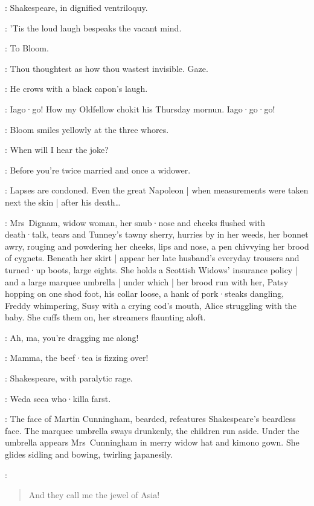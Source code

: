 :
Shakespeare,
in dignified ventriloquy.

\Shakespeare:
'Tis the loud laugh bespeaks the vacant mind.

:
To Bloom.

\Shakespeare:
Thou thoughtest as how thou wastest invisible.
Gaze.

:
He crows with a black capon's laugh.

\Shakespeare:
Iago·go!
How my Oldfellow chokit his Thursday mornun.
Iago·go·go!

:
Bloom smiles yellowly at the three whores.

\Bloom:
When will I hear the joke?

\Zoe:
Before you're twice married and once a widower.

\Bloom:
Lapses are condoned.
Even the great Napoleon |
when measurements were taken next the skin |
after his death…

:
Mrs~Dignam,
widow woman,
her snub·nose and cheeks flushed with death·talk,
tears and Tunney's tawny sherry,
hurries by in her weeds,
her bonnet awry,
rouging and powdering her cheeks,
lips and nose,
a pen chivvying her brood of cygnets.
%
Beneath her skirt |
appear her late husband's everyday trousers and turned·up boots,
large eights.
She holds a Scottish Widows' insurance policy |
and a large marquee umbrella |
under which |
her brood run with her,
Patsy hopping on one shod foot,
his collar loose,
a hank of pork·steaks dangling,
Freddy whimpering,
Susy with a crying cod's mouth,
Alice struggling with the baby.
She cuffs them on,
her streamers flaunting aloft.

\Freddy[1]:
Ah,
ma,
you're dragging me along!

\Susy[2]:
Mamma,
the beef·tea is fizzing over!

:
Shakespeare,
with paralytic rage.

\Shakespeare:
Weda seca who·killa farst.

:
The face of Martin Cunningham,
bearded,
refeatures Shakespeare's beardless face.
The marquee umbrella sways drunkenly,
the children run aside.
Under the umbrella appears Mrs~Cunningham in merry widow hat and kimono gown.
She glides sidling and bowing,
twirling japanesily.

\MrsCunningham:
\begin{verse}
    And they call me the jewel of Asia!
\end{verse}

